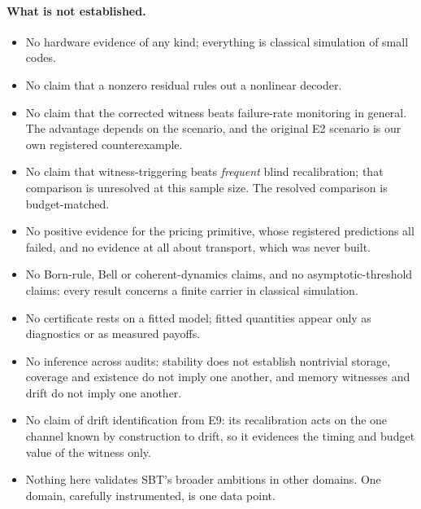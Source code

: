 \paragraph{What is not established.}
\begin{itemize}[nosep]
\item No hardware evidence of any kind; everything is classical simulation of small codes. %
\item No claim that a nonzero residual rules out a nonlinear decoder. %
\item No claim that the corrected witness beats failure-rate monitoring in general. The advantage depends on the scenario, and the original E2 scenario is our own registered counterexample. %
\item No claim that witness-triggering beats \emph{frequent} blind recalibration; that comparison is unresolved at this sample size. The resolved comparison is budget-matched. %
\item No positive evidence for the pricing primitive, whose registered predictions all failed, and no evidence at all about transport, which was never built. %
\item No Born-rule, Bell or coherent-dynamics claims, and no asymptotic-threshold claims: every result concerns a finite carrier in classical simulation. %
\item No certificate rests on a fitted model; fitted quantities appear only as diagnostics or as measured payoffs. %
\item No inference across audits: stability does not establish nontrivial storage, coverage and existence do not imply one another, and memory witnesses and drift do not imply one another. %
\item No claim of drift identification from E9: its recalibration acts on the one channel known by construction to drift, so it evidences the timing and budget value of the witness only. %
\item Nothing here validates SBT's broader ambitions in other domains. One domain, carefully instrumented, is one data point.
\end{itemize}


